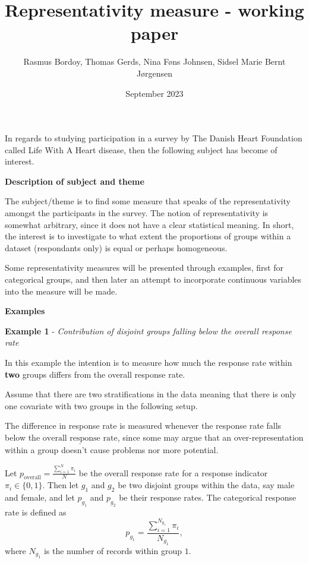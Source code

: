 \documentclass[
]{article}
\title{Representativity measure - working paper}
\author{Rasmus Bordoy, Thomas Gerds, Nina Føns Johnsen, Sidsel Marie
Bernt Jørgensen}
\date{September 2023}
\begin{document}
\maketitle

In regards to studying participation in a survey by The Danish Heart
Foundation called Life With A Heart disease, then the following subject
has become of interest.

\newline

\textbf{Description of subject and theme}

The subject/theme is to find some measure that speaks of the
representativity amongst the participants in the survey. The notion of
representativity is somewhat arbitrary, since it does not have a clear
statistical meaning. In short, the interest is to investigate to what
extent the proportions of groups within a dataset (respondants only) is
equal or perhaps homogeneous.

\newline

Some representativity measures will be presented through examples, first
for categorical groups, and then later an attempt to incorporate
continuous variables into the measure will be made.

\newline

\textbf{Examples}

\textbf{Example 1} - \emph{Contribution of disjoint groups falling below
the overall response rate}

In this example the intention is to measure how much the response rate
within \textbf{two} groups differs from the overall response rate.

Assume that there are two stratifications in the data meaning that there
is only one covariate with two groups in the following setup.

The difference in response rate is measured whenever the response rate
falls below the \(\underline{\text{overall response rate}}\), since some
may argue that an over-representation within a group doesn't cause
problems nor more potential.

\newline

Let \({p}_{\text{overall}} = \frac{\sum_{i=1}^{N} \pi_i}{N}\) be the
overall response rate for a response indicator \(\pi_i \in \{0,1\}\).
Then let \(g_1\) and \(g_2\) be two disjoint groups within the data, say
male and female, and let \({p}_{g_1}\) and \({p}_{g_2}\) be their
response rates. The categorical response rate is defined as
\[{p}_{g_1} =  \frac{\sum_{i=1}^{N_{g_1}} \pi_i }{N_{g_1}},\] where
\(N_{g_1}\) is the number of records within group \(1\).
\end{document}
